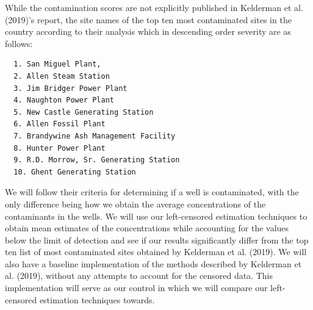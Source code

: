 \documentclass[12pt, twoside]{amherstthesis}
\begin{document}
While the contamination scores are not explicitly published in Kelderman et al. (2019)'s report, the site names of the top ten most contaminated sites in the country according to their analysis which in descending order severity are as follows:

\newpage
\begin{verbatim}
  1. San Miguel Plant,
  2. Allen Steam Station
  3. Jim Bridger Power Plant
  4. Naughton Power Plant
  5. New Castle Generating Station
  6. Allen Fossil Plant
  7. Brandywine Ash Management Facility
  8. Hunter Power Plant
  9. R.D. Morrow, Sr. Generating Station
  10. Ghent Generating Station
\end{verbatim}
We will follow their criteria for determining if a well is contaminated, with the only difference being how we obtain the average concentrations of the contaminants in the wells. We will use our left-censored estimation techniques to obtain mean estimates of the concentrations while accounting for the values below the limit of detection and see if our results significantly differ from the top ten list of most contaminated sites obtained by Kelderman et al. (2019). We will also have a baseline implementation of the methods described by Kelderman et al. (2019), without any attempts to account for the censored data. This implementation will serve as our control in which we will compare our left-censored estimation techniques towards.
\end{document}
